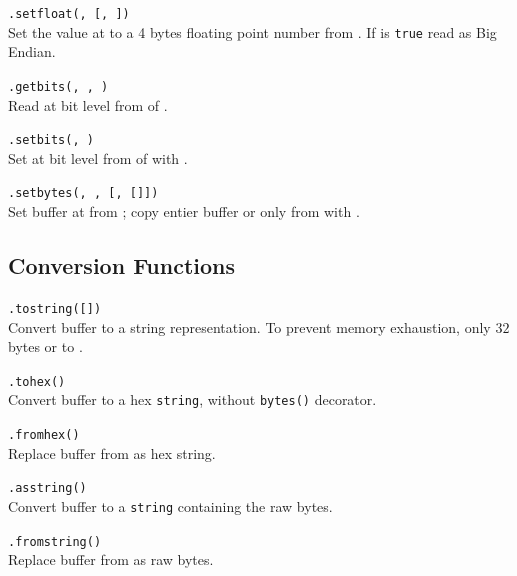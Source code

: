\hangpar {}\texttt{.setfloat(}\texttt{, }\texttt{[, }\texttt{])} \\
Set the value at  to a 4 bytes floating point number from . If  is \texttt{true} read as Big Endian.

\hangpar {}\texttt{.getbits(}\texttt{, }\texttt{, }\texttt{)} \\
Read at bit level from  of .

\hangpar {}\texttt{.setbits(}\texttt{, }\texttt{)} \\
Set at bit level from  of  with .

\hangpar {}\texttt{.setbytes(}\texttt{, }\texttt{, [}\texttt{, [}\texttt{]])}\\
Set buffer at  from ; copy entier buffer or only from  with .

\subsection*{Conversion Functions}

\hangpar {}\texttt{.tostring([}\texttt{])}\\
Convert  buffer to a string representation. To prevent memory exhaustion, only $32$ bytes or to .

\hangpar {}\texttt{.tohex()}\\
Convert  buffer to a hex \texttt{string}, without \texttt{bytes()} decorator.

\hangpar {}\texttt{.fromhex(}\texttt{)}\\
Replace  buffer from  as hex string.

\hangpar {}\texttt{.asstring()}\\
Convert  buffer to a \texttt{string} containing the raw bytes.

\hangpar {}\texttt{.fromstring(}\texttt{)}\\
Replace  buffer from  as raw bytes.

